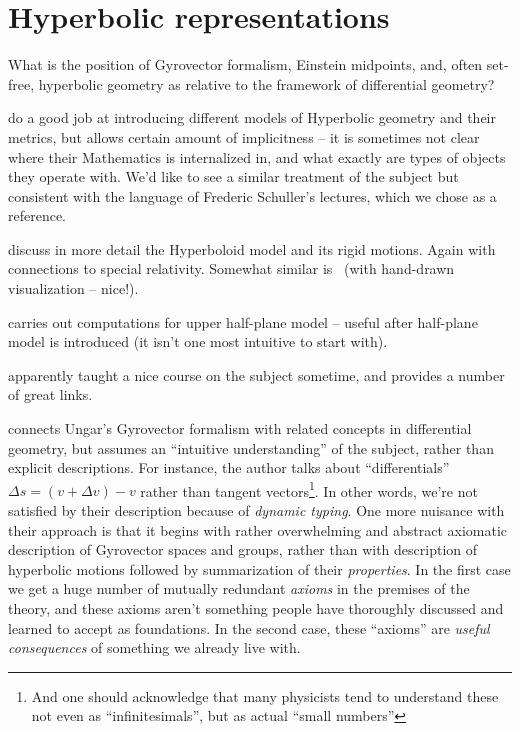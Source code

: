\chapter{Hyperbolic representations }\label{chap:hyperbolics}

What is the position of Gyrovector formalism, Einstein midpoints, and, often
set-free, hyperbolic geometry as relative to the framework of differential
geometry?

\citet{beardonMindaHyp} do a good job at introducing different models of
Hyperbolic geometry and their metrics, but allows certain amount of
implicitness -- it is sometimes not clear where their Mathematics is
internalized in, and what exactly are types of objects they operate with. We'd
like to see a similar treatment of the subject but consistent with the language
of Frederic Schuller's lectures, which we chose as a reference.

\citet{lavenda2008relativity} discuss in more detail the Hyperboloid model
and its rigid motions. Again with connections to special relativity.
Somewhat similar is~\citet{barrett2011hyperbolic} (with hand-drawn
visualization -- nice!).

\citet{snyder2009isometries} carries out computations for upper half-plane
model -- useful after half-plane model is introduced (it isn't one most
intuitive to start with).

\citet{droyster} apparently taught a nice course on the subject sometime, and
provides a number of great links.

\citet{ungarDiffGeom} connects Ungar's Gyrovector formalism with related
concepts in differential geometry, but assumes an ``intuitive understanding''
of the subject, rather than explicit descriptions. For instance, the author
talks about ``differentials'' \( \Delta s = (v + \Delta v) - v \) rather than
tangent vectors\footnote{And one should acknowledge that many physicists tend
to understand these not even as ``infinitesimals'', but as actual ``small
numbers''}. In other words, we're not satisfied by their description because of
\emph{dynamic typing}. One more nuisance with their approach is that it begins
with rather overwhelming and abstract axiomatic description of Gyrovector
spaces and groups, rather than with description of hyperbolic motions followed
by summarization of their \emph{properties}.  In the first case we get a huge
number of mutually redundant \emph{axioms} in the premises of the theory, and
these axioms aren't something people have thoroughly discussed and learned to
accept as foundations. In the second case, these ``axioms'' are \emph{useful
consequences} of something we already live with.

